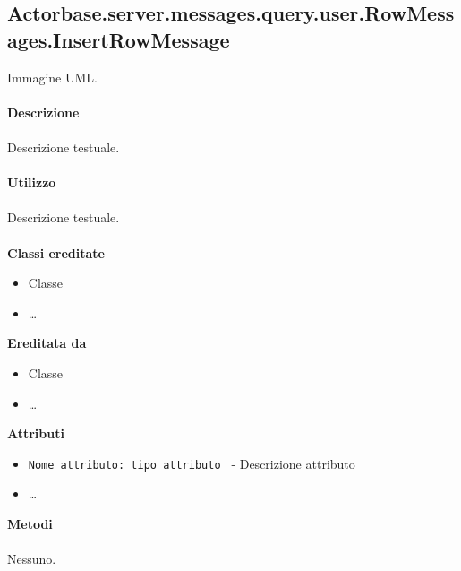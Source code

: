 \documentclass[a4paper]{article}
\begin{document}
	\subsection{Actorbase.server.messages.query.user.RowMessages.InsertRowMessage}
		Immagine UML.
		\\ \\
		\textbf{Descrizione}
			\\ \\
			Descrizione testuale.
			\\ \\
		\textbf{Utilizzo}
			\\ \\
			Descrizione testuale.
			\\ \\
		\textbf{Classi ereditate}
			\begin{itemize}
				\item Classe
				\item \dots
			\end{itemize}
		\textbf{Ereditata da}
			\begin{itemize}
				\item Classe
				\item \dots
			\end{itemize}
		\textbf{Attributi}
			\begin{itemize}
				\item \texttt{Nome attributo: tipo attributo } - Descrizione attributo
				\item \dots
			\end{itemize}
		\textbf{Metodi}
			\\ \\
			Nessuno.	
		
\end{document}

